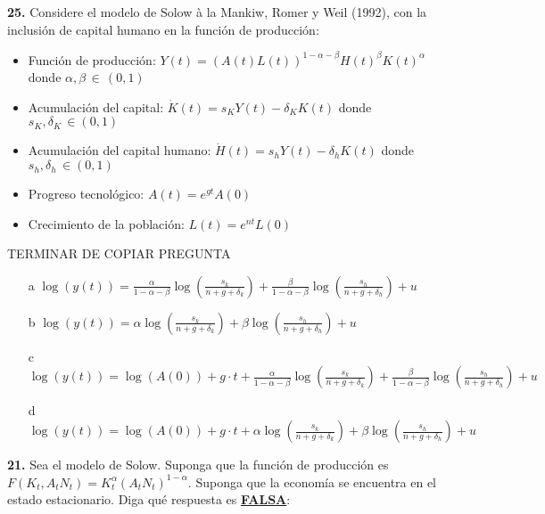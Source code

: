 \documentclass{nuevotema}
\begin{document}
\textbf{25.} Considere el modelo de Solow à la Mankiw, Romer y Weil (1992), con la inclusión de capital humano en la función de producción:

\begin{itemize}
	\item Función de producción: $Y(t) = \left( A(t) L(t) \right)^{1-\alpha-\beta} H(t)^\beta K(t)^\alpha$ donde $\alpha, \beta \, \in \, (0,1)$
	\item Acumulación del capital: $\dot{K}(t) = s_K Y(t) - \delta_K K(t)$ donde $s_K, \delta_K \, \in (0,1)$
	\item Acumulación del capital humano: $\dot{H}(t) = s_h Y(t) - \delta_h K(t)$ donde $s_h, \delta_h \, \in (0,1)$
	\item Progreso tecnológico: $A(t) = e^{gt} A(0)$
	\item Crecimiento de la población: $L(t) = e^{nt} L(0)$
\end{itemize}


TERMINAR DE COPIAR PREGUNTA

\begin{itemize}
	\item[a] $\log \left( y(t) \right) = \frac{\alpha}{1-\alpha-\beta} \log \left( \frac{s_k}{n+g+\delta_k} \right) + \frac{\beta}{1-\alpha - \beta} \log \left(  \frac{s_h}{n+g+\delta_h} \right) + u$
	\item[b] $\log \left( y(t) \right) = \alpha \log \left( \frac{s_k}{n+g+\delta_k} \right) + \beta \log \left(  \frac{s_h}{n+g+\delta_h} \right) + u$
	\item[c] $\log \left( y(t) \right) = \log \left( A(0) \right) + g \cdot t + \frac{\alpha}{1 - \alpha -\beta} \log \left( \frac{s_k}{n+g+\delta_k} \right) + \frac{\beta}{1-\alpha -\beta} \log \left( \frac{s_h}{n + g + \delta_h} \right) + u$
	\item[d] $\log \left( y(t) \right) = \log \left( A(0) \right) + g \cdot t + \alpha \log \left( \frac{s_k}{n+g+\delta_k} \right) + \beta \log \left( \frac{s_h}{n+g+\delta_h} \right) + u$
\end{itemize}

\textbf{21.} Sea el modelo de Solow. Suponga que la función de producción es $F(K_t, A_t N_t) = K_t^\alpha (A_t N_t)^{1-\alpha}$. Suponga que la economía se encuentra en el estado estacionario. Diga qué respuesta es \textbf{\underline{FALSA}}:
\end{document}
